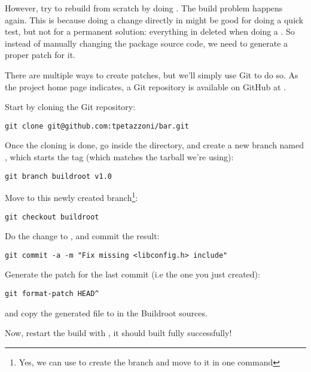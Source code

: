 However, try to rebuild  from scratch by doing . The build problem happens again. This is because
doing a change directly in  might be good for
doing a quick test, but not for a permanent solution: everything in
 deleted when doing a . So instead of
manually changing the package source code, we need to generate a
proper patch for it.

There are multiple ways to create patches, but we'll simply use Git to
do so. As the  project home page indicates, a Git repository
is available on GitHub at .

Start by cloning the Git repository:

\begin{verbatim}
git clone git@github.com:tpetazzoni/bar.git
\end{verbatim}

Once the cloning is done, go inside the  directory, and
create a new branch named , which starts the
 tag (which matches the  tarball we're
using):

\begin{verbatim}
git branch buildroot v1.0
\end{verbatim}

Move to this newly created branch\footnote{Yes, we can use  to create the branch and move to it in one command}:

\begin{verbatim}
git checkout buildroot
\end{verbatim}

Do the  change to , and
commit the result:

\begin{verbatim}
git commit -a -m "Fix missing <libconfig.h> include"
\end{verbatim}

Generate the patch for the last commit (i.e the one you just created):

\begin{verbatim}
git format-patch HEAD^
\end{verbatim}

and copy the generated  file to 
in the Buildroot sources.

Now, restart the build with , it should
built fully successfully!

